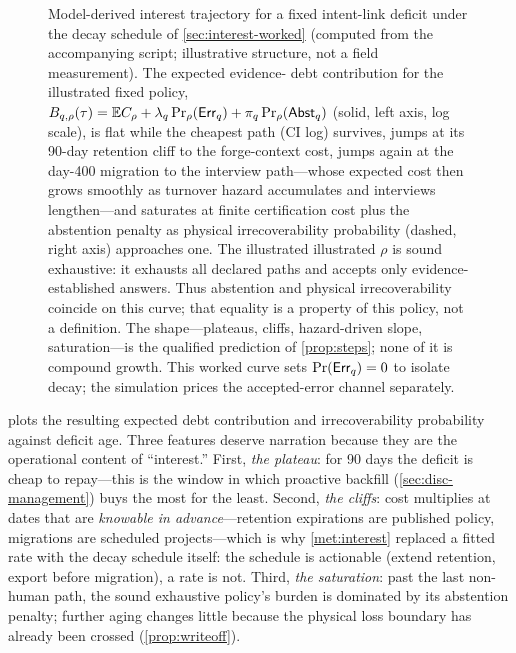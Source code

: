 \begin{figure}[t]
\centering

\caption{Model-derived interest trajectory for a fixed intent-link deficit under
the decay schedule of \cref{sec:interest-worked} (computed from the accompanying
script; illustrative structure, not a field measurement). The expected evidence-
debt contribution for the illustrated fixed policy,
$B_{q,\rho}(\tau)=\mathbb{E}C_\rho+\lambda_q\Pr_\rho(\mathsf{Err}_q)
+\pi_q\Pr_\rho(\mathsf{Abst}_q)$ (solid, left axis, log scale), is flat while the cheapest path (CI log)
survives, jumps at its 90-day retention cliff to the forge-context cost, jumps
again at the day-400 migration to the interview path---whose expected cost then
grows smoothly as turnover hazard accumulates and interviews lengthen---and
saturates at finite certification cost plus the abstention penalty as physical
irrecoverability probability (dashed, right axis) approaches one. The illustrated
illustrated $\rho$ is sound exhaustive: it exhausts all declared paths and accepts
only evidence-established answers. Thus abstention and physical irrecoverability
coincide on this curve; that equality is a property of this policy, not a
definition. The shape---plateaus, cliffs, hazard-driven slope, saturation---is the
qualified prediction of \cref{prop:steps}; none of it is compound growth. This
worked curve sets $\Pr(\mathsf{Err}_q)=0$ to isolate decay; the simulation prices the
accepted-error channel separately.}
\label{fig:interest}
\end{figure}

 plots the resulting expected debt contribution and irrecoverability
probability against deficit age. Three features deserve narration because they are
the operational content of ``interest.'' First, \emph{the plateau}: for 90 days
the deficit is cheap to repay---this is the window in which proactive backfill
(\cref{sec:disc-management}) buys the most for the least. Second, \emph{the
cliffs}: cost multiplies at dates that are \emph{knowable in advance}---retention
expirations are published policy, migrations are scheduled projects---which is why
\cref{met:interest} replaced a fitted rate with the decay schedule itself: the
schedule is actionable (extend retention, export before migration), a rate is not.
Third, \emph{the saturation}: past the last non-human path, the sound exhaustive policy's
burden is dominated by its abstention penalty; further aging changes little because
the physical loss boundary has already been crossed (\cref{prop:writeoff}).

